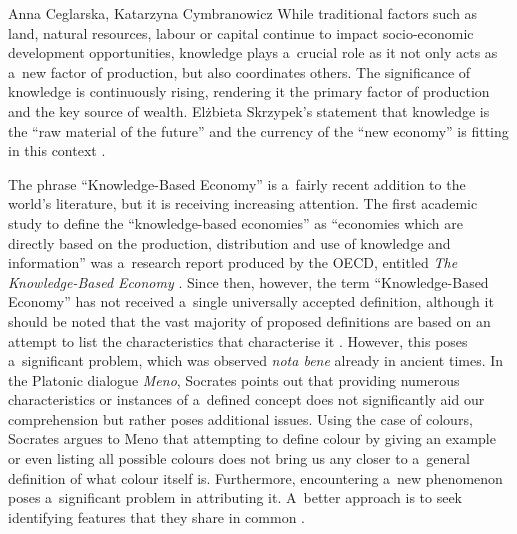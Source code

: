 \begin{artengenv2auth}{Anna Ceglarska, Katarzyna Cymbranowicz}
 While traditional factors such as land, natural resources, labour or capital continue to impact socio-economic development opportunities, knowledge plays a~crucial role as it not only acts as a~new factor of production, but also coordinates others. The significance of knowledge is continuously rising, rendering it the primary factor of production and the key source of wealth. Elżbieta Skrzypek's statement that knowledge is the ``raw material of the future'' and the currency of the ``new economy'' is fitting in this context 
\parencite[][p.20]{skrzypek_gow_2018}.%




The phrase ``Knowledge-Based Economy'' is a~fairly recent addition to the world's literature, but it is receiving increasing attention. The first academic study to define the ``knowledge-based economies'' as ``economies which are directly based on the production, distribution and use of knowledge and information'' was a~research report produced by the OECD, entitled \textit{The Knowledge-Based Economy} 
\parencite[][p.7]{oecd_knowledge-based_1996}. %
 Since then, however, the term ``Knowledge-Based Economy'' has not received a~single universally accepted definition, although it should be noted that the vast majority of proposed definitions are based on an attempt to list the characteristics that characterise it 
\parencite[][p.80]{kuklinski_wiedza_2001}. %
 However, this poses a~significant problem, which was observed \textit{nota bene} already in ancient times. In the Platonic dialogue \textit{Meno}, Socrates points out that providing numerous characteristics or instances of a~defined concept does not significantly aid our comprehension but rather poses additional issues. Using the case of colours, Socrates argues to Meno that attempting to define colour by giving an example or even listing all possible colours does not bring us any closer to a~general definition of what colour itself is. Furthermore, encountering a~new phenomenon poses a~significant problem in attributing it. A~better approach is to seek identifying features that they share in common 
\parencite[][74c-77a]{plato_plato_1967}. %

\end{artengenv2auth}
